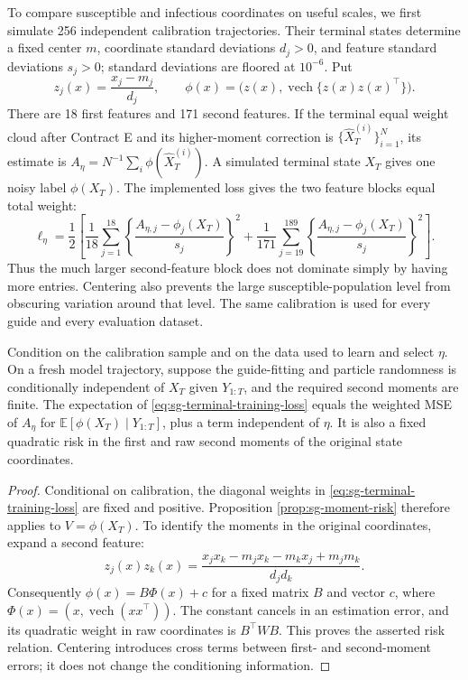 To compare susceptible and infectious coordinates on useful scales, we first
simulate 256 independent calibration trajectories. Their terminal states
determine a fixed center $m$, coordinate standard deviations $d_j>0$, and
feature standard deviations $s_j>0$; standard deviations are floored at
$10^{-6}$. Put
\begin{equation}
 z_j(x)=\frac{x_j-m_j}{d_j},\qquad
 \phi(x)=\bigl(z(x),\operatorname{vech}\{z(x)z(x)^\top\}\bigr).
 \label{eq:sg-calibrated-features}
\end{equation}
There are 18 first features and 171 second features. If the terminal equal
weight cloud after Contract E and its higher-moment correction is
$\{\widehat X_T^{(i)}\}_{i=1}^N$, its estimate is
$A_\eta=N^{-1}\sum_i\phi(\widehat X_T^{(i)})$. A simulated terminal state
$X_T$ gives one noisy label $\phi(X_T)$. The implemented loss gives the two
feature blocks equal total weight:
\begin{equation}
 \ell_\eta=\frac{1}{2}\left[
 \frac{1}{18}\sum_{j=1}^{18}
     \left\{\frac{A_{\eta,j}-\phi_j(X_T)}{s_j}\right\}^2
 +\frac{1}{171}\sum_{j=19}^{189}
     \left\{\frac{A_{\eta,j}-\phi_j(X_T)}{s_j}\right\}^2
 \right].
 \label{eq:sg-terminal-training-loss}
\end{equation}
Thus the much larger second-feature block does not dominate simply by having
more entries. Centering also prevents the large susceptible-population level
from obscuring variation around that level. The same calibration is used for
every guide and every evaluation dataset.

\begin{proposition}
\label{prop:sg-implemented-moment-risk}
Condition on the calibration sample and on the data used to learn and select
$\eta$. On a fresh model trajectory, suppose the guide-fitting and particle
randomness is conditionally independent of $X_T$ given $Y_{1:T}$, and the
required second moments are finite. The expectation of
\eqref{eq:sg-terminal-training-loss} equals the weighted MSE of $A_\eta$ for
$\mathbb E[\phi(X_T)\mid Y_{1:T}]$, plus a term independent of $\eta$.
It is also a fixed quadratic risk in the first and raw second moments of
the original state coordinates.
\end{proposition}
\begin{proof}
Conditional on calibration, the diagonal weights in
\eqref{eq:sg-terminal-training-loss} are fixed and positive. Proposition
\ref{prop:sg-moment-risk} therefore applies to $V=\phi(X_T)$.
To identify the moments in the original coordinates, expand a second feature:
\[
 z_j(x)z_k(x)=\frac{x_jx_k-m_jx_k-m_kx_j+m_jm_k}{d_jd_k}.
\]
Consequently $\phi(x)=B\Phi(x)+c$ for a fixed matrix $B$ and vector $c$,
where $\Phi(x)=(x,\operatorname{vech}(xx^\top))$. The constant cancels in
an estimation error, and its quadratic weight in raw coordinates is
$B^\top W B$. This proves the asserted risk relation. Centering introduces
cross terms between first- and second-moment errors; it does not change the
conditioning information.
\end{proof}

